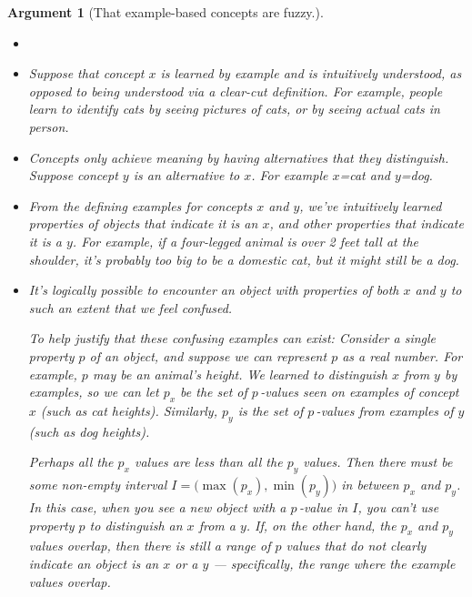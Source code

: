 \documentclass[11pt, oneside]{article}   	%
\newtheorem{argt}{Argument}
\begin{document}
\begin{argt}[That example-based concepts are fuzzy.]
    \label{a5}
    \normalfont
    \begin{itemize}
        \item[]
        \item Suppose that concept $x$ is learned by example and is
            intuitively understood, as opposed to being understood via
            a clear-cut definition.
            For
            example, people learn to identify {\em cats}
            by seeing pictures of cats, 
            or by seeing actual cats in person.
        \item Concepts only achieve meaning by having alternatives that they
            distinguish. Suppose concept $y$ is an alternative to $x$.
            For example $x$={\em cat} and $y$={\em dog}.
        \item From the defining examples for concepts $x$ and $y$, we've
            intuitively learned properties of objects
            that indicate it is an $x$, and other properties that indicate it is
            a $y$. For example, if a four-legged animal is over 2 feet tall at
            the
            shoulder, it's probably too big to be a domestic cat, but it might
            still be a dog.
        \item It's logically possible to encounter an object with properties of
            both $x$ and $y$ to such an extent that we feel confused.

            To help justify that these confusing examples can exist:
            Consider a single property $p$
            of an object, and suppose we can represent $p$ as a real number. For
            example, $p$ may be an animal's height. We learned to
            distinguish $x$ from $y$ by examples, so we can let $p_x$ be the set
            of $p$\,-values seen on examples of concept $x$ (such as cat
            heights).  Similarly, $p_y$
            is the set of $p$\,-values from examples of $y$ (such as dog
            heights).

            Perhaps all the $p_x$ values are less than all the $p_y$ values.
            Then there must be some non-empty interval
            $I=\big(\!\max(p_x), \min(p_y)\big)$ in between $p_x$ and $p_y$.
            In this case, when you see a new object with a $p$\,-value in $I$,
            you can't use property $p$ to distinguish an $x$ from a $y$.
            If, on the other hand, the $p_x$ and $p_y$ values overlap, then
            there is still a range of $p$ values
            that do not clearly indicate an object is an $x$ or a $y$ ---
            specifically, the range where the example values overlap.


\end{itemize}
\end{argt}
\end{document}
